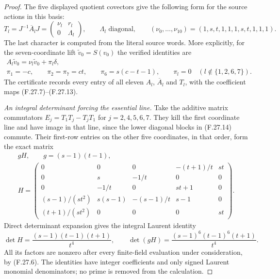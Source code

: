 \begin{proof}
The five displayed quotient covectors give the
following form for the source actions in this basis:
\[
 T_l=J^{-1}\overline A_lJ
       =\begin{pmatrix}\nu_l&r_l\\0&\Lambda_l\end{pmatrix},
 \qquad \Lambda_l\text{ diagonal},\qquad
 (\nu_0,\ldots,\nu_{10})=(1,s,t,1,1,1,s,t,1,1,1).
                                                               \tag{F.27.14}
\]
The last character is computed from the literal
source words. More explicitly, for the seven-coordinate
lift $\widetilde v_0=S(v_0)$ the verified identities are
\[
 \begin{gathered}
 A_l\widetilde v_0=\nu_l\widetilde v_0+\pi_l\delta,\\
 \pi_1=-c,\qquad \pi_2=\pi_7=ct,\qquad
 \pi_6=s(c-t-1),\qquad
 \pi_l=0\quad(l\notin\{1,2,6,7\}).
 \end{gathered}                                                \tag{F.27.15}
\]
The certificate records every entry of all eleven
$A_l$, $\overline A_l$ and $T_l$, with the coefficient
maps (F.27.7)--(F.27.13).

\emph{An integral determinant forcing the essential line.}
Take the additive matrix commutators
$E_j=T_1T_j-T_jT_1$ for $j=2,4,5,6,7$.
They kill the first coordinate line and have image
in that line, since the lower diagonal blocks
in (F.27.14) commute. Their first-row entries on
the other five coordinates, in that order, form
the exact matrix
\[
 \begin{gathered}
 gH,\qquad g=(s-1)(t-1),\\[-2pt]
 H=\begin{pmatrix}
 0&0&0&-(t+1)/t&st\\
 0&s&-1/t&0&0\\
 0&-1/t&0&st+1&0\\
 (s-1)/(st^2)&s(s-1)&-(s-1)/t&s-1&0\\
 (t+1)/(st^2)&0&0&0&st
 \end{pmatrix}.
 \end{gathered}                                                \tag{F.27.16}
\]
Direct determinant expansion gives the integral
Laurent identity
\[
 \det H=\frac{(s-1)(t-1)(t+1)}{t^4},\qquad
 \det(gH)=\frac{(s-1)^6(t-1)^6(t+1)}{t^4}.
                                                               \tag{F.27.17}
\]
All its factors are nonzero after every finite-field
evaluation under consideration, by (F.27.6).
The identities have integer coefficients and only
signed Laurent monomial denominators; no prime
is removed from the calculation.


\end{proof}
